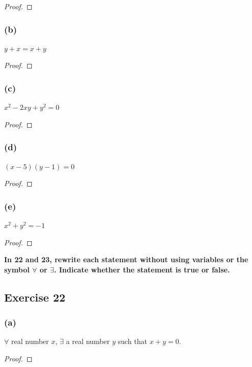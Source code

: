 \documentclass[14pt]{extarticle}
\newcommand{\fa}{\forall}
\newcommand{\te}{\exists}
\begin{document}
\begin{proof}

\end{proof}

\subsubsection{(b)}
$y + x = x + y$

\begin{proof}

\end{proof}

\subsubsection{(c)}
$x^2 - 2xy + y^2 = 0$

\begin{proof}

\end{proof}

\subsubsection{(d)}
$(x - 5)(y - 1) = 0$

\begin{proof}

\end{proof}

\subsubsection{(e)}
$x^2 + y^2 = -1$

\begin{proof}

\end{proof}

{\bf \color{cyan} In 22 and 23, rewrite each statement without using variables or the symbol $\fa$ or $\te$. Indicate whether the statement is true or false.}

\subsection{Exercise 22}
\subsubsection{(a)}
$\fa$ real number $x$, $\te$ a real number $y$ such that $x + y = 0$.

\begin{proof}

\end{proof}
\end{document}
